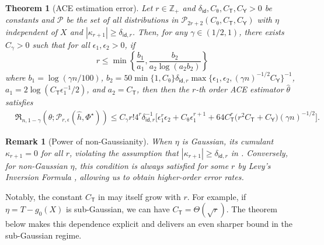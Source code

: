 \documentclass{article}
\def\eps{{\epsilon}}
\def\gP{{\mathcal{P}}}
\newtheorem{theorem}{Theorem}[section]
\newtheorem{remark}{Remark}[section]
\begin{document}
\begin{theorem}[ACE estimation error]
    \label{thm:arbitrary-order-orthogonal-finite-moments}
    Let $r\in\mathbb{Z}_+$ and  $\delta_{\mathsf{id}}, C_{\uptheta}, C_{\mathsf{T}}, C_{\mathsf{Y}} > 0$ be constants and $\gP$ be the set of all distributions in $\gP_{2r+2}(C_{\uptheta}, C_{\mathsf{T}}, C_{\mathsf{Y}})$ with $\eta$ independent of $X$ and $|\kappa_{r+1}|\geq \delta_{\mathsf{id},r}$.
    Then, for any $\gamma\in(1/2,1)$, there exists $C_{\gamma}>0$ such that for all $\eps_1,\eps_2>0$, if 
    \begin{equation}
        \label{eq:independent-noise-l-cond-finite-moments}\textstyle
        r \leq \min\left\{ \frac{b_1}{a_1}, \frac{b_2}{a_2\log(a_2b_2)}\right\}
    \end{equation}
    where $b_1=\log(\gamma n/100)$, $b_2=50\min\{1,C_{\uptheta}\}\delta_{\mathsf{id},r}\max\{\eps_1,\eps_2,(\gamma n)^{-1/2}C_{\mathsf{Y}}\}^{-1}$, $a_1 = 2\log(C_{\mathsf{T}}\eps_1^{-1}/2)$, and $a_2 = C_{\mathsf{T}}$, then then the $r$-th order ACE estimator $\hat\theta$ satisfies
    \begin{equation}
        \label{eq:arbitrary-order-orthogonal-finite-moments}
        \begin{aligned}
            & \mathfrak{R}_{n,1-\gamma} (\hat{\theta};\gP_{r,\eps}(\hat{h},\Phi^{\star})) \leq C_{\gamma} r!4^r \delta_{\mathsf{id},r}^{-1}\Big[ \eps_1^{r}\eps_2 + C_{\uptheta}\eps_1^{r+1} + 64C_{\mathsf{T}}^r\big(r^2C_{\mathsf{T}}+C_{\mathsf{Y}}\big) (\gamma n)^{-1/2} \Big].
        \end{aligned}
    \end{equation}
\end{theorem}
\begin{remark}[Power of non-Gaussianity]
When $\eta$ is Gaussian, its cumulant $\kappa_{r+1}=0$ for all $r$, violating the assumption that $|\kappa_{r+1}|\geq\delta_{\mathsf{id},r}$ in . Conversely, for non-Gaussian $\eta$, this condition is always satisfied for some $r$ by Levy’s Inversion
Formula \cite[Theorem 3.3.11]{durrett2019probability}, allowing us to obtain higher-order error rates. 
\end{remark}


%
Notably, the constant $C_{\mathsf{T}}$ in  may itself grow with $r$. For example, if $\eta = T - g_0(X)$ is sub-Gaussian, we can have $C_{\mathsf{T}} = \Theta(\sqrt{r})$. The theorem below makes this dependence explicit and delivers an even sharper bound in the sub-Gaussian regime.
\end{document}
